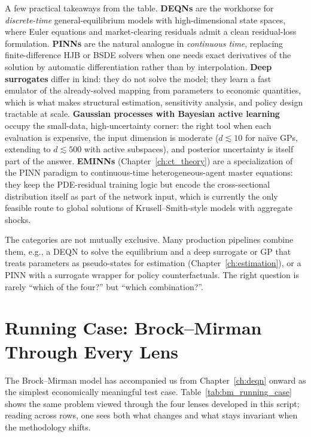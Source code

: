 \documentclass[11pt,a4paper]{report}
\begin{document}
\noindent A few practical takeaways from the table.  \textbf{DEQNs} are the workhorse for \emph{discrete-time} general-equilibrium models with high-dimensional state spaces, where Euler equations and market-clearing residuals admit a clean residual-loss formulation.  \textbf{PINNs} are the natural analogue in \emph{continuous time}, replacing finite-difference HJB or BSDE solvers when one needs exact derivatives of the solution by automatic differentiation rather than by interpolation.  \textbf{Deep surrogates} differ in kind: they do not solve the model; they learn a fast emulator of the already-solved mapping from parameters to economic quantities, which is what makes structural estimation, sensitivity analysis, and policy design tractable at scale.  \textbf{Gaussian processes with Bayesian active learning} occupy the small-data, high-uncertainty corner: the right tool when each evaluation is expensive, the input dimension is moderate ($d \lesssim 10$ for na\"ive GPs, extending to $d \lesssim 500$ with active subspaces), and posterior uncertainty is itself part of the answer.  \textbf{EMINNs} (Chapter~\ref{ch:ct_theory}) are a specialization of the PINN paradigm to continuous-time heterogeneous-agent master equations: they keep the PDE-residual training logic but encode the cross-sectional distribution itself as part of the network input, which is currently the only feasible route to global solutions of Krusell--Smith-style models with aggregate shocks.

The categories are not mutually exclusive.  Many production pipelines combine them, e.g., a DEQN to solve the equilibrium and a deep surrogate or GP that treats parameters as pseudo-states for estimation (Chapter~\ref{ch:estimation}), or a PINN with a surrogate wrapper for policy counterfactuals.  The right question is rarely ``which of the four?'' but ``which combination?''.

\section{Running Case: Brock--Mirman Through Every Lens}
\label{sec:running_case_bm}

The Brock--Mirman model has accompanied us from Chapter~\ref{ch:deqn} onward as the simplest economically meaningful test case.  Table~\ref{tab:bm_running_case} shows the same problem viewed through the four lenses developed in this script; reading across rows, one sees both what changes and what stays invariant when the methodology shifts.
\end{document}
